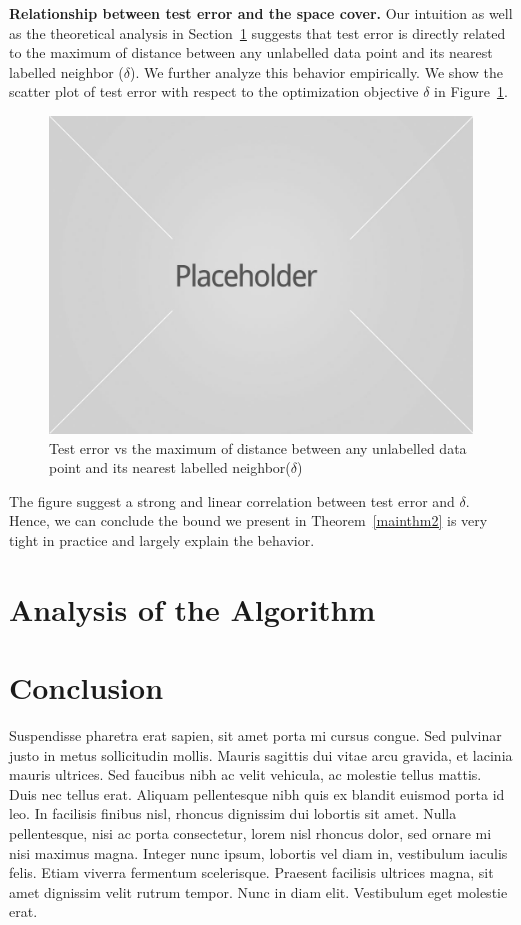 \documentclass{article}
\begin{document}
\noindent\textbf{Relationship between test error and the space cover.}
Our intuition as well as the theoretical analysis in Section~\ref{sec:analysis} suggests that test error is directly related to the maximum of distance between any unlabelled data point and its nearest labelled neighbor ($\delta$). We further analyze this behavior empirically. We show the scatter plot of test error with respect to the optimization objective $\delta$ in Figure~\ref{fig:scat}.
 
\begin{figure}[ht]
\includegraphics[width=\columnwidth]{placeholder1.jpg}
\caption{Test error vs the maximum of distance between any unlabelled data point and its nearest labelled neighbor($\delta$)}
\label{fig:scat}
\end{figure}

The figure suggest a strong and linear correlation between test error and $\delta$. Hence, we can conclude the bound we present in Theorem~\ref{mainthm2} is very tight in practice and largely explain the behavior.

\section{Analysis of the Algorithm}
\label{sec:analysis}


\section{Conclusion}
Suspendisse pharetra erat sapien, sit amet porta mi cursus congue. Sed pulvinar justo in metus sollicitudin mollis. Mauris sagittis dui vitae arcu gravida, et lacinia mauris ultrices. Sed faucibus nibh ac velit vehicula, ac molestie tellus mattis. Duis nec tellus erat. Aliquam pellentesque nibh quis ex blandit euismod porta id leo. In facilisis finibus nisl, rhoncus dignissim dui lobortis sit amet. Nulla pellentesque, nisi ac porta consectetur, lorem nisl rhoncus dolor, sed ornare mi nisi maximus magna. Integer nunc ipsum, lobortis vel diam in, vestibulum iaculis felis. Etiam viverra fermentum scelerisque. Praesent facilisis ultrices magna, sit amet dignissim velit rutrum tempor. Nunc in diam elit. Vestibulum eget molestie erat. 

\clearpage
 

\end{document}
